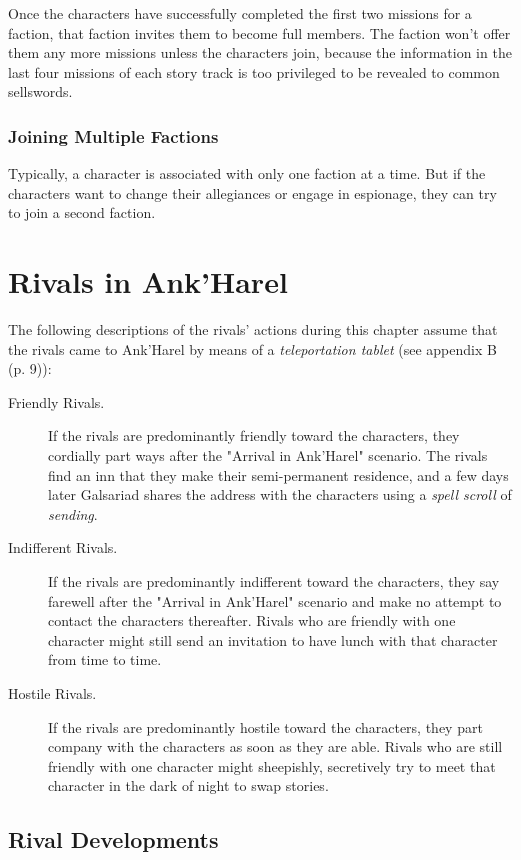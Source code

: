 \documentclass[a4paper, 11pt, bg=full, twocolumn, nooutline]{dndbook}
\begin{document}
Once the characters have successfully completed the first two missions for a faction, that faction invites them to become full members. The faction won't offer them any more missions unless the characters join, because the information in the last four missions of each story track is too privileged to be revealed to common sellswords.

\subsubsection{Joining Multiple Factions}

Typically, a character is associated with only one faction at a time. But if the characters want to change their allegiances or engage in espionage, they can try to join a second faction.
\section{Rivals in Ank'Harel}

The following descriptions of the rivals' actions during this chapter assume that the rivals came to Ank'Harel by means of a \textit{teleportation tablet} (see appendix B (p. 9)):

\begin{description}
\item[Friendly Rivals.] If the rivals are predominantly friendly toward the characters, they cordially part ways after the "Arrival in Ank'Harel" scenario. The rivals find an inn that they make their semi-permanent residence, and a few days later Galsariad shares the address with the characters using a \textit{spell scroll} of \textit{sending}.
\item[Indifferent Rivals.] If the rivals are predominantly indifferent toward the characters, they say farewell after the "Arrival in Ank'Harel" scenario and make no attempt to contact the characters thereafter. Rivals who are friendly with one character might still send an invitation to have lunch with that character from time to time.
\item[Hostile Rivals.] If the rivals are predominantly hostile toward the characters, they part company with the characters as soon as they are able. Rivals who are still friendly with one character might sheepishly, secretively try to meet that character in the dark of night to swap stories.
\end{description}

\subsection{Rival Developments}
\end{document}
